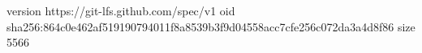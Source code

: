 version https://git-lfs.github.com/spec/v1
oid sha256:864c0e462af519190794011f8a8539b3f9d04558acc7cfe256c072da3a4d8f86
size 5566
